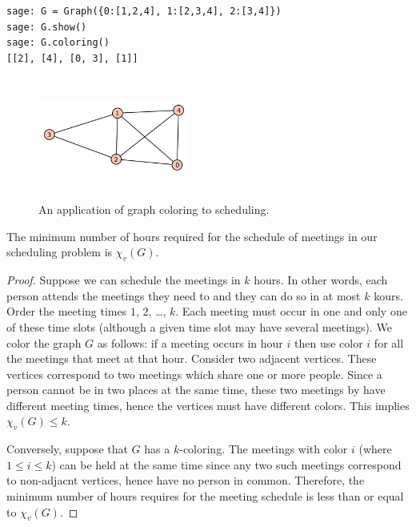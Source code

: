 \begin{lstlisting}
sage: G = Graph({0:[1,2,4], 1:[2,3,4], 2:[3,4]})
sage: G.show()
sage: G.coloring()
[[2], [4], [0, 3], [1]]
\end{lstlisting}

\begin{figure}[h!]
\begin{center}
\includegraphics[height=4cm,width=5cm]{image/graph-coloring/graph-coloring-scheduling}
\end{center}
\caption{An application of graph coloring to scheduling.}
\label{fig:graph-coloring-scheduling}
\end{figure}

\begin{theorem}
The minimum number of hours required for the schedule of meetings in
our scheduling problem is $\chi_v(G)$.
\end{theorem}

\begin{proof}

Suppose we can schedule the meetings in $k$ hours. In other words,
each person attends the meetings they need to and they
can do so in at most $k$ kours. Order the meeting
times $1$, $2$, \dots, $k$. Each meeting must occur in one and only
one of these time slots (although a given time slot may have
several meetings). We color the graph $G$ as follows:
if a meeting occurs in hour $i$ then use color $i$ for all the
meetings that meet at that hour. Consider two adjacent
vertices. These vertices correspond to two meetings which
share one or more people. Since a person cannot be in two places at
the same time, these two meetings by have different meeting times,
hence the vertices must have different colors. This implies
$\chi_v(G)\leq k$.

Conversely, suppose that $G$ has a $k$-coloring.
The meetings with color $i$ (where $1\leq i\leq k$)
can be held at the same time since any two such meetings
correspond to non-adjacnt vertices, hence have no
person in common. Therefore, the minimum number of
hours requires for the meeting schedule is less than
or equal to $\chi_v(G)$.

\end{proof}

